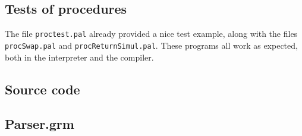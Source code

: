 \documentclass{article}
\begin{document}
\subsection{Tests of procedures}

The file \texttt{proctest.pal} already provided a nice test example, along with the files \texttt{procSwap.pal} and \texttt{procReturnSimul.pal}. These
programs all work as expected, both in the interpreter and the compiler.

\newpage
\begin{appendix}
\section{Source code}
\subsection{Parser.grm}
\label{parser}
    
%    
%    
%    
%    
\end{appendix}
\end{document}

